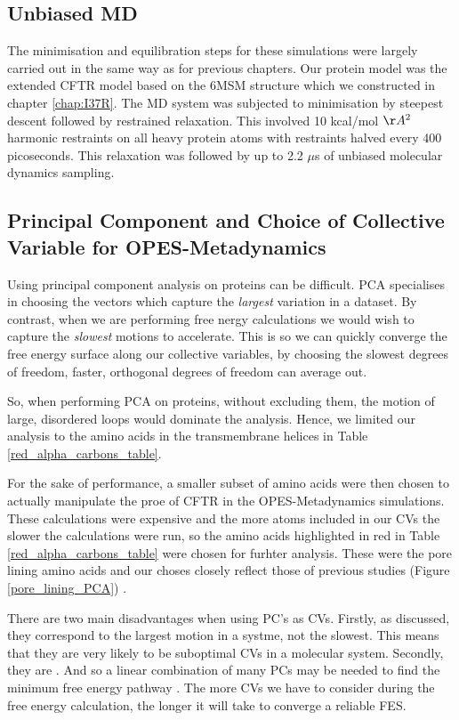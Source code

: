 \subsection{Unbiased MD }
The minimisation and equilibration steps for these simulations were largely carried out in the same way as for previous chapters. Our protein model was the extended CFTR model based on the 6MSM structure \cite{zhang2018} which we constructed in chapter \ref{chap:I37R}. The MD system was subjected to minimisation by steepest descent followed by restrained relaxation. This involved 10 kcal/mol $\AA^2$ harmonic restraints on all heavy protein atoms with restraints halved every 400 picoseconds. This relaxation was followed by up to 2.2 $\mu$s of unbiased molecular dynamics sampling.

\subsection {Principal Component and Choice of Collective Variable for OPES-Metadynamics}
Using principal component analysis on proteins can be difficult. PCA specialises in choosing the vectors which capture the \textit{largest} variation in a dataset. By contrast, when we are performing free nergy calculations we would wish to capture the \textit{slowest} motions to accelerate. This is so we can quickly converge the free energy surface along our collective variables, by choosing the slowest degrees of freedom, faster, orthogonal degrees of freedom can average out. 

So, when performing PCA on proteins, without excluding them, the motion of large, disordered loops would dominate the analysis. Hence, we limited our analysis to the amino acids in the transmembrane helices in Table \ref{red_alpha_carbons_table}. 

For the sake of performance, a smaller subset of amino acids were then chosen to actually manipulate the proe of CFTR in the OPES-Metadynamics simulations. These calculations were expensive and the more atoms included in our CVs the slower the calculations were run, so the amino acids highlighted in red in Table \ref{red_alpha_carbons_table} were chosen for furhter analysis. These were the pore lining amino acids and our choses closely reflect those of previous studies (Figure \ref{pore_lining_PCA}) \cite{hoffman2018}. 

There are two main disadvantages when using PC's as CVs. Firstly, as discussed, they correspond to the largest motion in a systme, not the slowest. This means that they are very likely to be suboptimal CVs in a molecular system. Secondly, they are . And so a linear combination of many PCs  may be needed to find the minimum free energy pathway \cite{}. The more CVs we have to consider during the free energy calculation, the longer it will take to converge a reliable FES.

